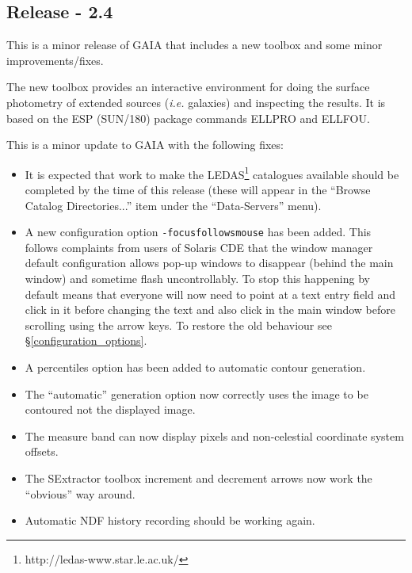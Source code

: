 \documentclass[twoside,11pt]{article}
\newcommand{\htmladdnormallinkfoot}[2]{#1\footnote{#2}}
\newcommand{\hyperref}[4]{#2\ref{#4}#3}
\newcommand{\xref}[3]{#1}
\renewcommand{\_}{\texttt{\symbol{95}}}
\newcommand{\mytt}[1]{{\texttt{#1}}}
\begin{document}
\subsection{Release - 2.4}
This is a minor release of GAIA that includes a new toolbox and some
minor improvements/fixes.

The new toolbox provides an interactive environment for doing the
surface photometry of extended sources (\textit{i.e.} galaxies) and inspecting
the results. It is based on the ESP (\xref{SUN/180}{sun180}{}) package
commands ELLPRO and ELLFOU.

This is a minor update to GAIA with the following fixes:
\begin{itemize}
\item It is expected that work to make the
      \htmladdnormallinkfoot{LEDAS}{http://ledas-www.star.le.ac.uk/}
      catalogues available should be completed by the time of this
      release (these will appear in the ``Browse Catalog
      Directories...'' item under the ``Data-Servers'' menu).

\item A new configuration option \mytt{-focus\_follows\_mouse} has been
      added. This follows complaints from users of Solaris CDE that
      the window manager default configuration allows pop-up windows
      to disappear (behind the main window) and sometime flash
      uncontrollably. To stop this happening by default means that
      everyone will now need to point at a text entry field and click
      in it before changing the text and also click in the main window
      before scrolling using the arrow keys. To restore the old
      behaviour see
      \hyperref{configuration options}{\S}{}{configuration_options}.

\item A percentiles option has been added to automatic contour
      generation.

\item The ``automatic'' generation option now correctly uses the image
      to be contoured not the displayed image.

\item The measure band can now display pixels and non-celestial
      coordinate system offsets.

\item The SExtractor toolbox increment and decrement arrows now work
      the ``obvious'' way around.

\item Automatic NDF history recording should be working again.


\end{itemize}
\end{document}
